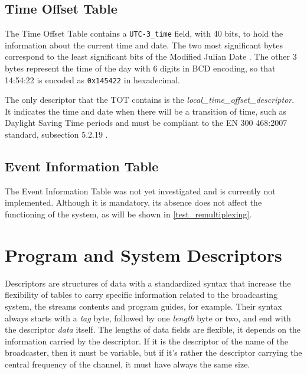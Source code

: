 \documentclass[
	12pt,				%
	openright,			%
	twoside,			%
	a4paper,			%
	brazil,
	french,				%
	english
	]{abntex2}
\begin{document}
\subsection{Time Offset Table}
\label{TOT}
The Time Offset Table contains a \texttt{UTC-3\hspace{0.1mm}\_\hspace{0.1mm}time} field, with 40 bits, to hold the information about the current time and date. The two most significant bytes correspond to the least significant bits of the Modified Julian Date . The other 3 bytes represent the time of the day with 6 digits in BCD encoding, so that 14:54:22 is encoded as \texttt{0x145422} in hexadecimal.

The only descriptor that the TOT contains is the \textit{local\hspace{0.1mm}\_\hspace{0.1mm}time\hspace{0.1mm}\_\hspace{0.1mm}offset\hspace{0.1mm}\_\hspace{0.1mm}descriptor}. It indicates the time and date when there will be a transition of time, such as Daylight Saving Time periods and must be compliant to the EN 300 468:2007 standard, subsection 5.2.19 .

\subsection{Event Information Table}
\label{EIT}
The Event Information Table was not yet investigated and is currently not implemented. Although it is mandatory, its absence does not affect the functioning of the system, as will be shown in \autoref{test_remultiplexing}.

\section{Program and System Descriptors}
\label{descriptors}
Descriptors are structures of data with a standardized syntax that increase the flexibility of tables to carry specific information related to the broadcasting system, the streams contents and program guides, for example. Their syntax always starts with a \textit{tag} byte, followed by one \textit{length} byte or two, and end with the descriptor \textit{data} itself. The lengths of data fields are flexible, it depends on the information carried by the descriptor. If it is the descriptor of the name of the broadcaster, then it must be variable, but if it's rather the descriptor carrying the central frequency of the channel, it must have always the same size.
\end{document}
